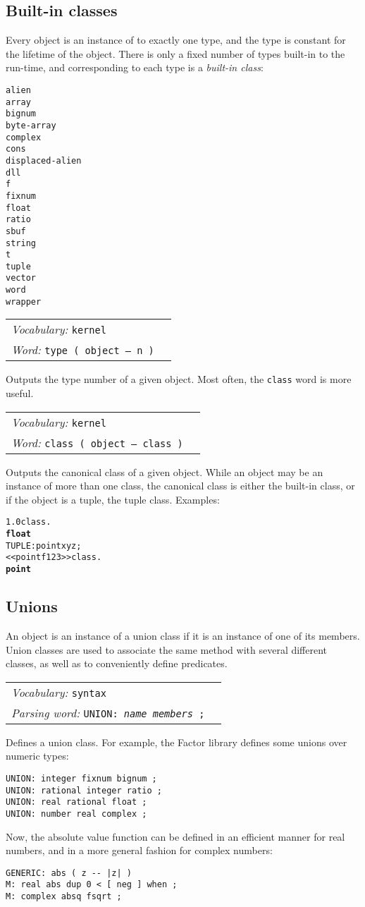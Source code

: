 \documentclass{book}
\newcommand{\vocabulary}[1]{\emph{Vocabulary:} \texttt{#1}&\\}
\newcommand{\parsingword}[2]{\index{\texttt{#1}}\emph{Parsing word:} \texttt{#2}&\\}
\newcommand{\ordinaryword}[2]{\index{\texttt{#1}}\emph{Word:} \texttt{#2}&\\}
\newcommand{\wordtable}[1]{


\begin{tabularx}{12cm}{lX}
\hline
#1
\hline
\end{tabularx}

}
\begin{document}
\subsection{Built-in classes}
Every object is an instance of to exactly one type, and the type is constant for the lifetime of the object. There is only a fixed number of types built-in to the run-time, and corresponding to each type is a \emph{built-in class}:
\begin{verbatim}
alien
array
bignum
byte-array
complex
cons
displaced-alien
dll
f
fixnum
float
ratio
sbuf
string
t
tuple
vector
word
wrapper
\end{verbatim}
\wordtable{
\vocabulary{kernel}
\ordinaryword{type}{type ( object -- n )}
}
Outputs the type number of a given object. Most often, the \texttt{class} word is more useful.
\wordtable{
\vocabulary{kernel}
\ordinaryword{class}{class ( object -- class )}
}
Outputs the canonical class of a given object. While an object may be an instance of more than one class, the canonical class is either the built-in class, or if the object is a tuple, the tuple class. Examples:
\begin{alltt}
  1.0 class .
\textbf{float}
  TUPLE: point x y z ;
  << point f 1 2 3 >> class .
\textbf{point}
\end{alltt}

\subsection{Unions}
An object is an instance of a union class if it is an instance of one of its members. Union classes are used to associate the same method with several different classes, as well as to conveniently define predicates.
\wordtable{
\vocabulary{syntax}
\parsingword{UNION:}{UNION: \emph{name} \emph{members} ;}
}
Defines a union class. For example, the Factor library defines some unions over numeric types:
\begin{verbatim}
UNION: integer fixnum bignum ;
UNION: rational integer ratio ;
UNION: real rational float ;
UNION: number real complex ;
\end{verbatim}
Now, the absolute value function can be defined in an efficient manner
for real numbers, and in a more general fashion for complex numbers:
\begin{verbatim}
GENERIC: abs ( z -- |z| )
M: real abs dup 0 < [ neg ] when ;
M: complex absq fsqrt ;
\end{verbatim}
\end{document}
